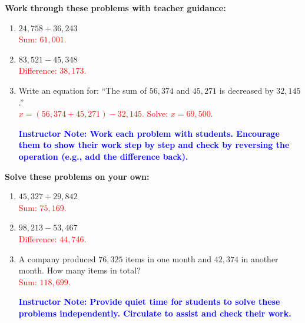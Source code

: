 \documentclass[27.11148pt]{article}
\newcommand{\solution}[1]{\textcolor{red}{#1}}
\newcommand{\note}[1]{\textcolor{blue}{\textbf{Instructor Note: #1}}}
\begin{document}
\begin{tcolorbox}[colframe=black!60, colback=white, 
coltitle=black, colbacktitle=black!15, fonttitle=\bfseries\Large, 
title=Guided Practice, halign title=center, left=10pt, right=10pt, top=10pt, bottom=15pt]
\textbf{Work through these problems with teacher guidance:}
\begin{enumerate}[itemsep=3em]
    \item \( 24,758 + 36,243 \)\\
    \solution{Sum: \( 61,001 \).}
    \item \( 83,521 - 45,348 \)\\
    \solution{Difference: \( 38,173 \).}
    \item Write an equation for: “The sum of \( 56,374 \) and \( 45,271 \) is decreased by \( 32,145 \).”\\
    \solution{\( x = (56,374 + 45,271) - 32,145 \). Solve: \( x = 69,500 \).}

    \note{Work each problem with students. Encourage them to show their work step by step and check by reversing the operation (e.g., add the difference back).}
\end{enumerate}
\end{tcolorbox}

\begin{tcolorbox}[colframe=black!60, colback=white, 
coltitle=black, colbacktitle=black!15, fonttitle=\bfseries\Large, 
title=Independent Practice, halign title=center, left=10pt, right=10pt, top=10pt, bottom=15pt]
\textbf{Solve these problems on your own:}
\begin{enumerate}[itemsep=3em]
    \item \( 45,327 + 29,842 \)\\
    \solution{Sum: \( 75,169 \).}
    \item \( 98,213 - 53,467 \)\\
    \solution{Difference: \( 44,746 \).}
    \item A company produced \( 76,325 \) items in one month and \( 42,374 \) in another month. How many items in total?\\
    \solution{Sum: \( 118,699 \).}

    \note{Provide quiet time for students to solve these problems independently. Circulate to assist and check their work.}
\end{enumerate}
\end{tcolorbox}
\end{document}
